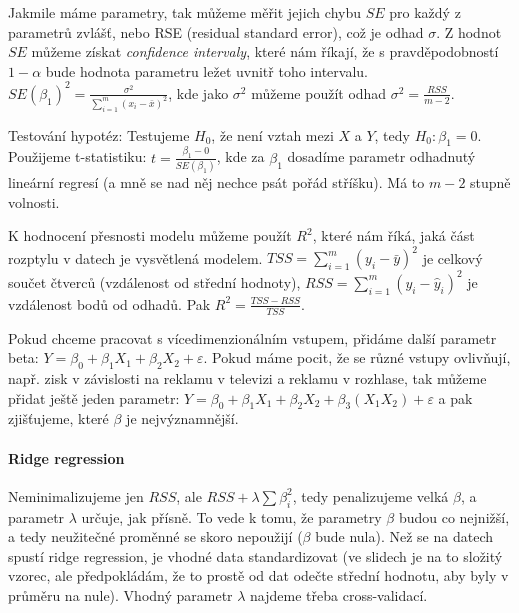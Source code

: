 \documentclass[10pt,a4paper]{article}
\begin{document}
\begin{figure}[ht!]
\centering
{}
\end{figure}

Jakmile máme parametry, tak můžeme měřit jejich chybu $SE$ pro každý z parametrů zvlášť, nebo RSE (residual standard error), což je odhad $\sigma$. Z hodnot $SE$ můžeme získat \textit{confidence intervaly}, které nám říkají, že s pravděpodobností $1-\alpha$ bude hodnota parametru ležet uvnitř toho intervalu. $SE(\beta_1)^2 = \frac{\sigma^2}{\sum_{i=1}^m(x_i-\bar{x})^2}$, kde jako $\sigma^2$ můžeme použít odhad $\sigma^2 = \frac{RSS}{m-2}$.

Testování hypotéz: Testujeme $H_0$, že není vztah mezi $X$ a $Y$, tedy $H_0: \beta_1 = 0$. Použijeme t-statistiku: $t = \frac{\beta_1 - 0}{SE(\beta_1)}$, kde za $\beta_1$ dosadíme parametr odhadnutý lineární regresí (a mně se nad něj nechce psát pořád stříšku). Má to $m-2$ stupně volnosti.

K hodnocení přesnosti modelu můžeme použít $R^2$, které nám říká, jaká část rozptylu v datech je vysvětlená modelem. $TSS = \sum_{i=1}^m(y_i - \bar{y})^2$ je celkový součet čtverců (vzdálenost od střední hodnoty), $RSS = \sum_{i=1}^m(y_i - \hat{y}_i)^2$ je vzdálenost bodů od odhadů. Pak $R^2 = \frac{TSS - RSS}{TSS}$.

Pokud chceme pracovat s vícedimenzionálním vstupem, přidáme další parametr beta:  $Y = \beta_0 + \beta_1 X_1 + \beta_2 X_2 + \varepsilon$. Pokud máme pocit, že se různé vstupy ovlivňují, např. zisk v závislosti na reklamu v televizi a reklamu v rozhlase, tak můžeme přidat ještě jeden parametr: $Y = \beta_0 + \beta_1 X_1 + \beta_2 X_2 + \beta_3 (X_1 X_2) + \varepsilon$ a pak zjišťujeme, které $\beta$ je nejvýznamnější.

\paragraph{Ridge regression}
Neminimalizujeme jen $RSS$, ale $RSS + \lambda\sum\beta_i^2$, tedy penalizujeme velká $\beta$, a parametr $\lambda$ určuje, jak přísně. To vede k tomu, že parametry $\beta$ budou co nejnižší, a tedy neužitečné proměnné se skoro nepoužijí ($\beta$ bude nula). Než se na datech spustí ridge regression, je vhodné data standardizovat (ve slidech je na to složitý vzorec, ale předpokládám, že to prostě od dat odečte střední hodnotu, aby byly v průměru na nule). Vhodný parametr $\lambda$ najdeme třeba cross-validací.
\end{document}
